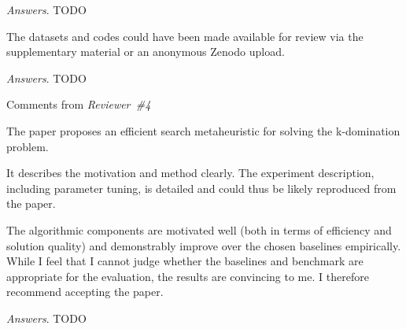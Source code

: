 \documentclass [11pt]{scrartcl}
\begin{document}
\emph{Answers}. TODO 

\begin{leftbar}
	The datasets and codes could have been made available for review via the supplementary material or an anonymous Zenodo upload.
\end{leftbar}

\emph{Answers}. TODO 



\begin{center} Comments from \textit{Reviewer\ \#4}

\end{center}

\begin{leftbar}
	The paper proposes an efficient search metaheuristic for solving the k-domination problem.
	
	It describes the motivation and method clearly. The experiment description, including parameter tuning, is detailed and could thus be likely reproduced from the paper.
	
	The algorithmic components are motivated well (both in terms of efficiency and solution quality) and demonstrably improve over the chosen baselines empirically. While I feel that I cannot judge whether the baselines and benchmark are appropriate for the evaluation, the results are convincing to me. I therefore recommend accepting the paper.
\end{leftbar}

\emph{Answers}. TODO 






\end{document}
